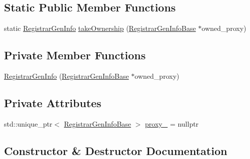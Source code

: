 \subsection*{Static Public Member Functions}
\begin{DoxyCompactItemize}
\item 
static \hyperlink{structvt_1_1auto__registry_1_1_registrar_gen_info}{Registrar\+Gen\+Info} \hyperlink{structvt_1_1auto__registry_1_1_registrar_gen_info_a5d200e841fd5ac4bd1aee02d67f77c15}{take\+Ownership} (\hyperlink{structvt_1_1auto__registry_1_1_registrar_gen_info_base}{Registrar\+Gen\+Info\+Base} $\ast$owned\+\_\+proxy)
\end{DoxyCompactItemize}
\subsection*{Private Member Functions}
\begin{DoxyCompactItemize}
\item 
\hyperlink{structvt_1_1auto__registry_1_1_registrar_gen_info_a05db1e5aaa88d02dce2e96e15dee2aa9}{Registrar\+Gen\+Info} (\hyperlink{structvt_1_1auto__registry_1_1_registrar_gen_info_base}{Registrar\+Gen\+Info\+Base} $\ast$owned\+\_\+proxy)
\end{DoxyCompactItemize}
\subsection*{Private Attributes}
\begin{DoxyCompactItemize}
\item 
std\+::unique\+\_\+ptr$<$ \hyperlink{structvt_1_1auto__registry_1_1_registrar_gen_info_base}{Registrar\+Gen\+Info\+Base} $>$ \hyperlink{structvt_1_1auto__registry_1_1_registrar_gen_info_a7f3d40cb988a3d3b56f9cbd5f910d14c}{proxy\+\_\+} = nullptr
\end{DoxyCompactItemize}


\subsection{Constructor \& Destructor Documentation}
\mbox{\label{structvt_1_1auto__registry_1_1_registrar_gen_info_a0075b2464a5cb4b940520ea19bb85682}} 
